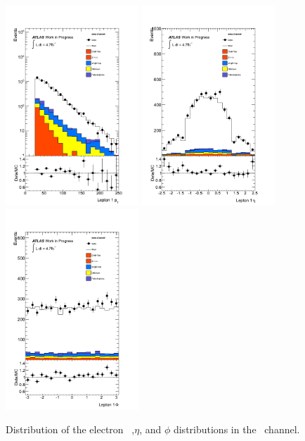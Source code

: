 \begin{figure}[htbp!]
     \begin{center}
     \includegraphics[width=50mm]{f/emu_lep1_pt_central_double}
     \includegraphics[width=50mm]{f/emu_lep1_eta_central_double}
     \includegraphics[width=50mm]{f/emu_lep1_phi_central_double}
     \end{center}
     \caption{Distribution of the electron \pt\ ,$\eta$, and $\phi$ distributions in the \emu\ channel.}
     \label{fig:dilep_lep1_emu}
    \end{figure}

